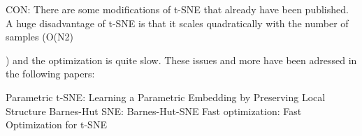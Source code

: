 
%
%




CON: There are some modifications of t-SNE that already have been published. A huge disadvantage of t-SNE is that it scales quadratically with the number of samples (O(N2)

) and the optimization is quite slow. These issues and more have been adressed in the following papers:

Parametric t-SNE: Learning a Parametric Embedding by Preserving Local Structure
Barnes-Hut SNE: Barnes-Hut-SNE
Fast optimization: Fast Optimization for t-SNE


